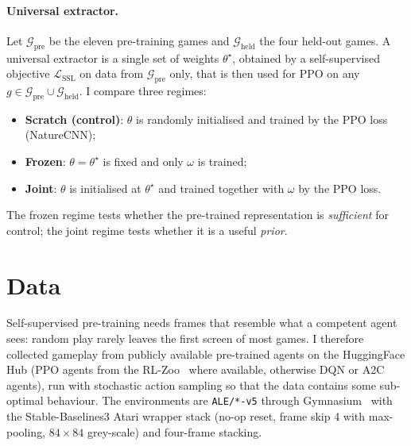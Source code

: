 \documentclass[runningheads]{llncs}
\begin{document}
\paragraph{Universal extractor.}
Let $\mathcal{G}_{\text{pre}}$ be the eleven pre-training games and
$\mathcal{G}_{\text{held}}$ the four held-out games. A universal extractor is a single
set of weights $\theta^\star$, obtained by a self-supervised objective
$\mathcal{L}_{\text{SSL}}$ on data from $\mathcal{G}_{\text{pre}}$ only, that is then
used for PPO on any $g\in\mathcal{G}_{\text{pre}}\cup\mathcal{G}_{\text{held}}$. I
compare three regimes:
\begin{itemize}
  \item \textbf{Scratch (control)}: $\theta$ is randomly initialised and trained by the
  PPO loss (NatureCNN);
  \item \textbf{Frozen}: $\theta=\theta^\star$ is fixed and only $\omega$ is trained;
  \item \textbf{Joint}: $\theta$ is initialised at $\theta^\star$ and trained together
  with $\omega$ by the PPO loss.
\end{itemize}
The frozen regime tests whether the pre-trained representation is \emph{sufficient}
for control; the joint regime tests whether it is a useful \emph{prior}.

\section{Data}
\label{sec:data}

Self-supervised pre-training needs frames that resemble what a competent agent sees:
random play rarely leaves the first screen of most games. I therefore collected
gameplay from publicly available pre-trained agents on the HuggingFace Hub (PPO agents
from the RL-Zoo~\cite{raffin2020zoo} where available, otherwise DQN or A2C agents), run
with stochastic action sampling so that the data contains some sub-optimal
behaviour. The environments are \texttt{ALE/*-v5} through Gymnasium~\cite{towers2024gymnasium}
with the Stable-Baselines3 Atari wrapper stack (no-op reset, frame skip 4 with
max-pooling, $84\times84$ grey-scale) and four-frame stacking.
\end{document}
